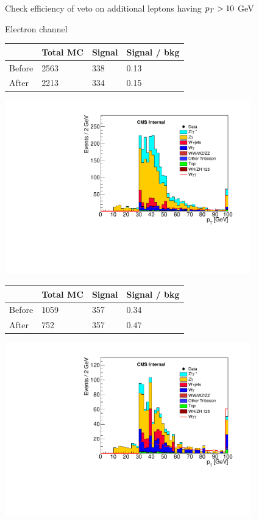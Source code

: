 \documentclass{beamer}
\begin{document}
 {

    Check efficiency of veto on additional leptons having $p_{T} > 10$ GeV

    \vspace{2mm}

    \bc
    \scriptsize
        Electron channel

        \begin{tabular}{| l l l l |}  \hline
                     & Total MC  & Signal & Signal / bkg \\ \hline
        Before       &  2563 & 338       &  0.13 \\
        After        &  2213 & 334       &  0.15 \\
        \end{tabular}

        \includegraphics[width=0.8\textwidth]{Plots/el_pt_ephph_no2ndveto.pdf}


    \scriptsize

        \begin{tabular}{| l l l l |}  \hline
               & Total MC  & Signal & Signal / bkg \\ \hline
        Before & 1059      & 357    & 0.34             \\
        After  & 752       & 357    & 0.47              \\
        \end{tabular}

        \includegraphics[width=0.8\textwidth]{Plots/mu_pt_mphph_no2ndveto.pdf}

    \ec
}
\end{document}
